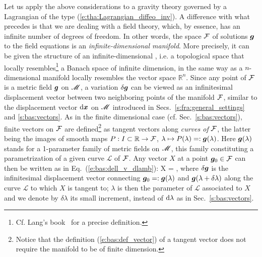Let us apply the above considerations to a gravity
theory governed by a Lagrangian of the type (\ref{e:tha:Lagrangian_diffeo_inv}).
A difference with what precedes is that
we are dealing with a field theory, which, by essence, has
an infinite number of degrees of freedom. In other words,
the space $\mathcal{F}$ of solutions $\bm{g}$ to the field equations is
an \emph{infinite-dimensional manifold}. More precisely, it can be given the structure of an
infinite-dimensional 
\cite{LeeW90,HarloW20}, i.e. a topological space that locally resembles\footnote{Cf. Lang's book~\cite{Lang95} for a
precise definition.} a Banach space of infinite dimension, in the same
way as a $n$-dimensional manifold locally resembles the vector space $\mathbb{R}^n$.
Since any point of $\mathcal{F}$ is a metric field $\bm{g}$ on $\mathscr{M}$, a variation $\delta\bm{g}$
can be viewed as an infinitesimal displacement vector between two neighboring points of the manifold
$\mathcal{F}$, similar to the displacement vector $\mathrm{d}\bm{x}$ on $\mathscr{M}$ introduced in Secs.~\ref{s:fra:general_settings} and \ref{s:bas:vectors}.
As in the finite dimensional case
(cf. Sec.~\ref{s:bas:vectors}), finite vectors on $\mathcal{F}$
are defined\footnote{Notice that the definition (\ref{e:bas:def_vector}) of a tangent vector
does not require the manifold to be of finite dimension.} as tangent vectors
along \emph{curves of} $\mathcal{F}$, the latter being the images of smooth maps
$P: I\subset \mathbb{R} \to  \mathcal{F}$, $\lambda\mapsto P(\lambda) =: \bm{g}(\lambda)$. Here
$\bm{g}(\lambda)$ stands for a 1-parameter family of metric fields
on $\mathscr{M}$, this family constituting a parametrization of a given curve $\mathcal{L}$ of $\mathcal{F}$.
Any vector $X$ at a point $\bm{g}_0 \in \mathcal{F}$ can then be written as in Eq.~(\ref{e:bas:dell_v_dlamb}):
\be \label{e:tha:X_dg/dlambda}
    X =  ,
\ee
where $\delta\bm{g}$ is the infinitesimal displacement vector connecting $\bm{g}_0 =: \bm{g}(\lambda)$
and $\bm{g}(\lambda+\delta\lambda)$ along the curve $\mathcal{L}$
to which $X$ is tangent to; $\lambda$ is then the parameter of $\mathcal{L}$ associated to $X$
and we denote by $\delta\lambda$ its small increment, instead of $\mathrm{d}\lambda$ as in Sec.~\ref{s:bas:vectors}.


